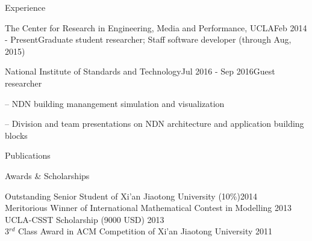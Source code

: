 \documentclass{resume} %
\begin{document}
\begin{rSection}{Experience}
\begin{rSubsection}{The Center for Research in Engineering, Media and Performance, UCLA}{Feb 2014 - Present}{Graduate student researcher; Staff software developer (through Aug, 2015)}{}
\end{rSubsection}

\begin{rSubsection}{National Institute of Standards and Technology}{Jul 2016 - Sep 2016}{Guest researcher}{}
\item[--] NDN building manangement simulation and visualization
\item[--] Division and team presentations on NDN architecture and application building blocks
\end{rSubsection}

\end{rSection}


\begin{rSection}{Publications}

\nocite{*}




\end{rSection}


\begin{rSection}{Awards \& Scholarships}

Outstanding Senior Student of Xi'an Jiaotong University (10\%)\hfill 2014 \\
Meritorious Winner of International Mathematical Contest in Modelling \hfill 2013 \\
UCLA-CSST Scholarship (9000 USD) \hfill 2013 \\
3$^{rd}$ Class Award in ACM Competition of Xi'an Jiaotong University \hfill 2011 \\

\end{rSection}
\end{document}
